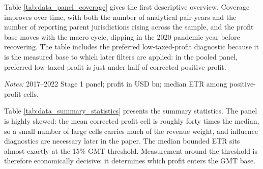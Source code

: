\documentclass[11pt,a4paper]{article}
\begin{document}
Table \ref{tab:data_panel_coverage} gives the first descriptive overview. Coverage improves over time, with both the number of analytical pair-years and the number of reporting parent jurisdictions rising across the sample, and the profit base moves with the macro cycle, dipping in the 2020 pandemic year before recovering. The table includes the preferred low-taxed-profit diagnostic because it is the measured base to which later filters are applied: in the pooled panel, preferred low-taxed profit is just under half of corrected positive profit.

\begin{table}[H]
\centering
\footnotesize
\setlength{\tabcolsep}{3pt}
\caption[Analytical panel coverage by fiscal year]{Analytical panel coverage by fiscal year}
\label{tab:data_panel_coverage}

\vspace{0.35em}
\noindent\begin{minipage}{\textwidth}
\footnotesize\raggedright\textit{Notes:} 2017--2022 Stage 1 panel; profit in USD bn; median ETR among positive-profit cells.
\end{minipage}
\end{table}

Table \ref{tab:data_summary_statistics} presents the summary statistics. The panel is highly skewed: the mean corrected-profit cell is roughly forty times the median, so a small number of large cells carries much of the revenue weight, and influence diagnostics are necessary later in the paper. The median bounded ETR sits almost exactly at the 15\% GMT threshold. Measurement around the threshold is therefore economically decisive: it determines which profit enters the GMT base.
\end{document}
